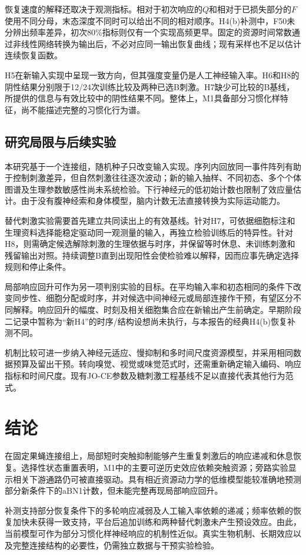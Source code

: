 恢复速度的解释还取决于观测指标。相对于初次响应的$Q$和相对于已损失部分的$F$使用不同分母，末态深度不同时可以给出不同的相对顺序。H4(b)补测中，F50未分辨出频率差异，初次80\%指标则仅有一个实现高频更早。固定的资源时间常数通过非线性网络转换为输出后，不必对应同一输出恢复曲线；现有采样也不足以估计连续恢复函数。

H5在新输入实现中呈现一致方向，但其强度变量仍是人工神经输入率。H6和H8的阴性结果分别限于12/24次训练比较及两种已选B刺激。H7缺少可比较的B基线，所提供的信息与有效比较中的阴性结果不同。整体上，M1具备部分习惯化样特征，尚不能描述完整的习惯化行为谱。

\subsection{研究局限与后续实验}
本研究基于一个连接组，随机种子只改变输入实现。序列内回放同一事件阵列有助于控制刺激差异，但自然刺激往往逐次波动；新的输入抽样、不同初态、多个个体图谱及生理参数敏感性尚未系统检验。下行神经元的低初始计数也限制了效应量估计。由于没有腹神经索和身体模型，脑内计数无法直接转换为实际运动能力。

替代刺激实验需要首先建立共同读出上的有效基线。针对H7，可依据细胞标注和生理资料选择能稳定驱动同一观测量的输入，再独立检验训练后的特异性。针对H8，则需确定候选解除刺激的生理依据与时序，并保留等时休息、未训练刺激和残留输出对照。持续调整B直到出现阳性会使检验难以解释，因而应事先确定选择规则和停止条件。

局部响应回升可作为另一项判别实验的目标。在平均输入率和初态相同的条件下改变同步性、细胞分配或时序，并对候选中间神经元或局部连接作干预，有望区分不同解释。响应回升的幅度、时刻及相关细胞集合应在新输出产生前确定。早期阶段二记录中暂称为“新H4”的时序/结构设想尚未执行，与本报告的经典H4(b)恢复补测不同。

机制比较可进一步纳入神经元适应、慢抑制和多时间尺度资源模型，并采用相同数据预算及留出干预。转向嗅觉、视觉或味觉范式时，还需重新确定输入编码、响应指标和时间尺度。现有JO-CE参数及糖刺激工程基线不足以直接代表其他行为范式。

\section{结论}
在固定果蝇连接组上，局部短时突触抑制能够产生重复刺激后的响应递减和休息恢复。选择性状态重置表明，M1中的主要可逆历史效应依赖突触资源；旁路实验显示相关下游通路仍可被直接驱动。具有相近资源动力学的低维模型能较准确地预测部分新条件下的aBN1计数，但未能完整再现局部响应回升。

补测支持部分恢复条件下的多轮响应减弱及人工输入率依赖的递减；频率依赖的恢复加快未获得一致支持，平台后追加训练和两种替代刺激未产生预设效应。由此，当前模型可作为部分习惯化样神经响应的机制性近似。真实生物机制、长期效应以及完整连接结构的必要性，仍需独立数据与干预实验检验。

